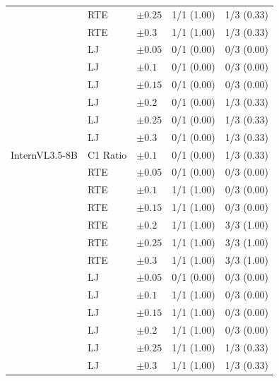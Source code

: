 \begin{longtable}{lllcc}
 & RTE & $\pm0.25$ & 1/1 (1.00) & 1/3 (0.33) \\
 & RTE & $\pm0.3$ & 1/1 (1.00) & 1/3 (0.33) \\
\midrule
 & LJ & $\pm0.05$ & 0/1 (0.00) & 0/3 (0.00) \\
 & LJ & $\pm0.1$ & 0/1 (0.00) & 0/3 (0.00) \\
 & LJ & $\pm0.15$ & 0/1 (0.00) & 0/3 (0.00) \\
 & LJ & $\pm0.2$ & 0/1 (0.00) & 1/3 (0.33) \\
 & LJ & $\pm0.25$ & 0/1 (0.00) & 1/3 (0.33) \\
 & LJ & $\pm0.3$ & 0/1 (0.00) & 1/3 (0.33) \\
\midrule
InternVL3.5-8B & C1 Ratio & $\pm0.1$ & 0/1 (0.00) & 1/3 (0.33) \\
 & RTE & $\pm0.05$ & 0/1 (0.00) & 0/3 (0.00) \\
 & RTE & $\pm0.1$ & 1/1 (1.00) & 0/3 (0.00) \\
 & RTE & $\pm0.15$ & 1/1 (1.00) & 0/3 (0.00) \\
 & RTE & $\pm0.2$ & 1/1 (1.00) & 3/3 (1.00) \\
 & RTE & $\pm0.25$ & 1/1 (1.00) & 3/3 (1.00) \\
 & RTE & $\pm0.3$ & 1/1 (1.00) & 3/3 (1.00) \\
\midrule
 & LJ & $\pm0.05$ & 0/1 (0.00) & 0/3 (0.00) \\
 & LJ & $\pm0.1$ & 1/1 (1.00) & 0/3 (0.00) \\
 & LJ & $\pm0.15$ & 1/1 (1.00) & 0/3 (0.00) \\
 & LJ & $\pm0.2$ & 1/1 (1.00) & 0/3 (0.00) \\
 & LJ & $\pm0.25$ & 1/1 (1.00) & 1/3 (0.33) \\
 & LJ & $\pm0.3$ & 1/1 (1.00) & 1/3 (0.33) \\
\end{longtable}
